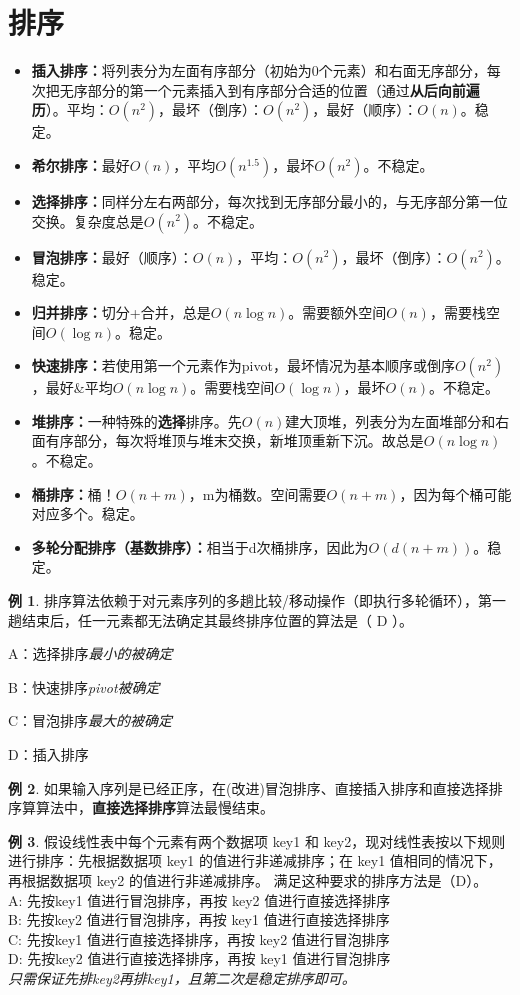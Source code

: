 \documentclass[hyperref,a4paper,UTF8,12pt]{ctexart}
\theoremstyle{definition}
\newtheorem{example}{例}[section]
\begin{document}
\section{排序}
\begin{itemize}
    \item \textbf{插入排序：}将列表分为左面有序部分（初始为0个元素）和右面无序部分，每次把无序部分的第一个元素插入到有序部分合适的位置（通过\textbf{从后向前遍历}）。平均：$O(n^2)$，最坏（倒序）：$O(n^2)$，最好（顺序）：$O(n)$。稳定。
    \item \textbf{希尔排序：}最好$O(n)$，平均$O(n^{1.5})$，最坏$O(n^2)$。不稳定。
    \item \textbf{选择排序：}同样分左右两部分，每次找到无序部分最小的，与无序部分第一位交换。复杂度总是$O(n^2)$。不稳定。
    \item \textbf{冒泡排序：}最好（顺序）：$O(n)$，平均：$O(n^2)$，最坏（倒序）：$O(n^2)$。稳定。
    \item \textbf{归并排序：}切分+合并，总是$O(n\log n)$。需要额外空间$O(n)$，需要栈空间$O(\log n)$。稳定。
    \item \textbf{快速排序：}若使用第一个元素作为pivot，最坏情况为基本顺序或倒序$O(n^2)$，最好\&平均$O(n\log n)$。需要栈空间$O(\log n)$，最坏$O(n)$。不稳定。
    \item \textbf{堆排序：}一种特殊的\textbf{选择}排序。先$O(n)$建大顶堆，列表分为左面堆部分和右面有序部分，每次将堆顶与堆末交换，新堆顶重新下沉。故总是$O(n\log n)$。不稳定。
    \item \textbf{桶排序：}桶！$O(n+m)$，m为桶数。空间需要$O(n+m)$，因为每个桶可能对应多个。稳定。
    \item \textbf{多轮分配排序（基数排序）：}相当于d次桶排序，因此为$O(d(n+m))$。稳定。
\end{itemize}
\begin{example}
    排序算法依赖于对元素序列的多趟比较/移动操作（即执行多轮循环），第一趟结束后，任一元素都无法确定其最终排序位置的算法是（ D ）。

A：选择排序\quad \textit{最小的被确定}

B：快速排序\quad \textit{pivot被确定}

C：冒泡排序\quad \textit{最大的被确定}

D：插入排序
\end{example}
\begin{example}
    如果输入序列是已经正序，在(改进)冒泡排序、直接插入排序和直接选择排序算算法中，\textbf{直接选择排序}算法最慢结束。
\end{example}
\begin{example}
    假设线性表中每个元素有两个数据项 key1 和 key2，现对线性表按以下规则进行排序：先根据数据项 key1 的值进行非递减排序；在 key1 值相同的情况下，再根据数据项 key2 的值进行非递减排序。
满足这种要求的排序方法是（D）。\\
A: 先按key1 值进行冒泡排序，再按 key2 值进行直接选择排序\\
B: 先按key2 值进行冒泡排序，再按 key1 值进行直接选择排序\\
C: 先按key1 值进行直接选择排序，再按 key2 值进行冒泡排序\\
D: 先按key2 值进行直接选择排序，再按 key1 值进行冒泡排序\\
\textit{只需保证先排key2再排key1，且第二次是稳定排序即可。}
\end{example}
\end{document}
